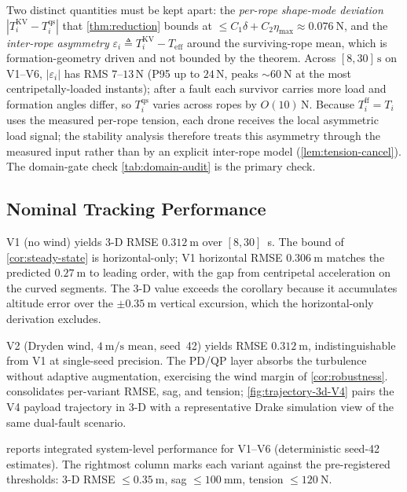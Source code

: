 \documentclass[lettersize,journal]{IEEEtran}
\begin{document}
Two distinct quantities must be kept apart: the \emph{per-rope shape-mode deviation} $|T_i^{\mathrm{KV}}-T_i^{\mathrm{qs}}|$ that \cref{thm:reduction} bounds at $\le C_1\delta+C_2\eta_{\max}\approx\SI{0.076}{\newton}$, and the \emph{inter-rope asymmetry} $\varepsilon_i\triangleq T_i^{\mathrm{KV}}-T_{\mathrm{eff}}$ around the surviving-rope mean, which is formation-geometry driven and not bounded by the theorem. Across $[8,30]\,\si{\second}$ on V1--V6, $|\varepsilon_i|$ has RMS $7$--$13$\,N (P95 up to $24$\,N, peaks $\sim\SI{60}{\newton}$ at the most centripetally-loaded instants); after a fault each survivor carries more load and formation angles differ, so $T_i^{\mathrm{qs}}$ varies across ropes by $O(10)$\,N. Because $T_i^{\mathrm{ff}}=T_i$ uses the measured per-rope tension, each drone receives the local asymmetric load signal; the stability analysis therefore treats this asymmetry through the measured input rather than by an explicit inter-rope model (\cref{lem:tension-cancel}). The domain-gate check \cref{tab:domain-audit} is the primary check.

\subsection{Nominal Tracking Performance}
\label{sec:VI-B}

V1 (no wind) yields 3-D RMSE $\SI{0.312}{\metre}$ over $[8,30]$~s. The bound of \cref{cor:steady-state} is horizontal-only; V1 horizontal RMSE $\SI{0.306}{\metre}$ matches the predicted $\SI{0.27}{\metre}$ to leading order, with the gap from centripetal acceleration on the curved segments. The 3-D value exceeds the corollary because it accumulates altitude error over the $\pm\SI{0.35}{\metre}$ vertical excursion, which the horizontal-only derivation excludes.

V2 (Dryden wind, $\SI{4}{\metre\per\second}$ mean, seed~42) yields RMSE $\SI{0.312}{\metre}$, indistinguishable from V1 at single-seed precision. The PD/QP layer absorbs the turbulence without adaptive augmentation, exercising the wind margin of \cref{cor:robustness}.  consolidates per-variant RMSE, sag, and tension; \cref{fig:trajectory-3d-V4} pairs the V4 payload trajectory in 3-D with a representative Drake simulation view of the same dual-fault scenario.


 reports integrated system-level performance for V1--V6 (deterministic seed-42 estimates). The rightmost column marks each variant against the pre-registered thresholds: 3-D RMSE $\le \SI{0.35}{\metre}$, sag $\le \SI{100}{\milli\metre}$, tension $\le \SI{120}{\newton}$.
\end{document}
